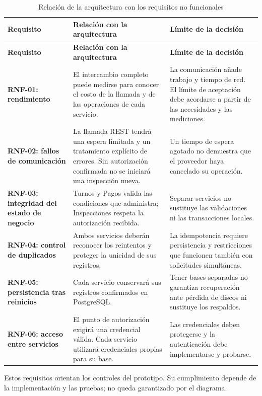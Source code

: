 \documentclass[11pt,a4paper]{article}
\begin{document}
\begin{xltabular}{\textwidth}{L{3.2cm}XX}
  \caption{Relación de la arquitectura con los requisitos no funcionales}\label{tab:arq-rnf}\\
  \toprule
  \textbf{Requisito} & \textbf{Relación con la arquitectura} & \textbf{Límite de la decisión} \\
  \midrule
  \endfirsthead
  \toprule
  \textbf{Requisito} & \textbf{Relación con la arquitectura} & \textbf{Límite de la decisión} \\
  \midrule
  \endhead
  \bottomrule
  \endfoot
  \textbf{RNF-01: rendimiento} & El intercambio completo puede medirse para conocer el costo de la llamada y de las operaciones de cada servicio. & La comunicación añade trabajo y tiempo de red. El límite de aceptación debe acordarse a partir de las necesidades y las mediciones. \\
  \textbf{RNF-02: fallos de comunicación} & La llamada REST tendrá una espera limitada y un tratamiento explícito de errores. Sin autorización confirmada no se iniciará una inspección nueva. & Un tiempo de espera agotado no demuestra que el proveedor haya cancelado su operación. \\
  \textbf{RNF-03: integridad del estado de negocio} & Turnos y Pagos valida las condiciones que administra; Inspecciones respeta la autorización recibida. & Separar servicios no sustituye las validaciones ni las transacciones locales. \\
  \textbf{RNF-04: control de duplicados} & Ambos servicios deberán reconocer los reintentos y proteger la unicidad de sus registros. & La idempotencia requiere persistencia y restricciones que funcionen también con solicitudes simultáneas. \\
  \textbf{RNF-05: persistencia tras reinicios} & Cada servicio conservará sus registros confirmados en PostgreSQL. & Tener bases separadas no garantiza recuperación ante pérdida de discos ni sustituye los respaldos. \\
  \textbf{RNF-06: acceso entre servicios} & El punto de autorización exigirá una credencial válida. Cada servicio utilizará credenciales propias para su base. & Las credenciales deben protegerse y la autenticación debe implementarse y probarse. \\
\end{xltabular}

Estos requisitos orientan los controles del prototipo. Su cumplimiento depende de la implementación y las pruebas; no queda garantizado por el diagrama.
\end{document}
